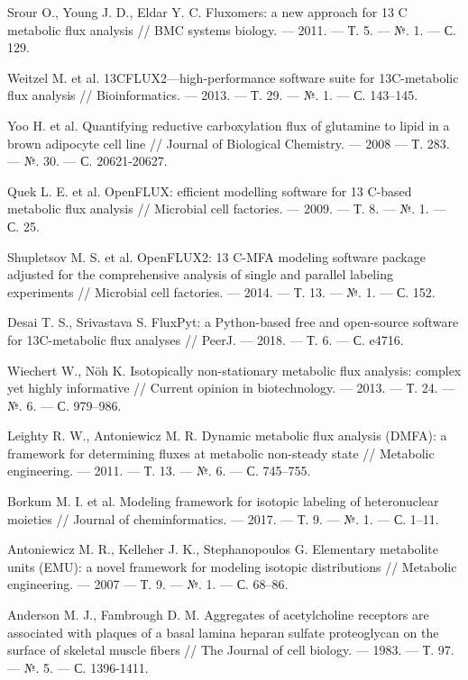 \documentclass[14pt, a4paper]{extreport}
\begin{document}
\begin{thebibliography}{XXXX}
	Srour O., Young J. D., Eldar Y. C. Fluxomers: a new approach for 13 C metabolic flux analysis // BMC systems biology. --- 2011. --- Т. 5. --- №. 1. --- С. 129.
		
	Weitzel M. et al. 13CFLUX2—high-performance software suite for 13C-metabolic flux analysis // Bioinformatics. --- 2013. --- Т. 29. --- №. 1. --- С. 143--145.
	
	Yoo H. et al. Quantifying reductive carboxylation flux of glutamine to lipid in a brown adipocyte cell line // Journal of Biological Chemistry. --- 2008 --- Т. 283. --- №. 30. --- С. 20621-20627.
	
	Quek L. E. et al. OpenFLUX: efficient modelling software for 13 C-based metabolic flux analysis // Microbial cell factories. --- 2009. --- Т. 8. --- №. 1. --- С. 25.
	
	Shupletsov M. S. et al. OpenFLUX2: 13 C-MFA modeling software package adjusted for the comprehensive analysis of single and parallel labeling experiments // Microbial cell factories. --- 2014. --- Т. 13. --- №. 1. --- С. 152.
	
	Desai T. S., Srivastava S. FluxPyt: a Python-based free and open-source software for 13C-metabolic flux analyses // PeerJ. --- 2018. --- Т. 6. --- С. e4716.
	
	Wiechert W., Nöh K. Isotopically non-stationary metabolic flux analysis: complex yet highly informative // Current opinion in biotechnology. --- 2013. --- Т. 24. --- №. 6. --- С. 979--986.
	
	Leighty R. W., Antoniewicz M. R. Dynamic metabolic flux analysis (DMFA): a framework for determining fluxes at metabolic non-steady state // Metabolic engineering. --- 2011. --- Т. 13. --- №. 6. --- С. 745--755.

	Borkum M. I. et al. Modeling framework for isotopic labeling of heteronuclear moieties // Journal of cheminformatics. --- 2017. --- Т. 9. --- №. 1. --- С. 1--11.
	
	Antoniewicz M. R., Kelleher J. K., Stephanopoulos G. Elementary metabolite units (EMU): a novel framework for modeling isotopic distributions // Metabolic engineering. --- 2007 --- Т. 9. --- №. 1. --- С. 68--86.
	

	
	Anderson M. J., Fambrough D. M. Aggregates of acetylcholine receptors are associated with plaques of a basal lamina heparan sulfate proteoglycan on the surface of skeletal muscle fibers // The Journal of cell biology. --- 1983. --- Т. 97. --- №. 5. --- С. 1396-1411.
	

\end{thebibliography}
\end{document}
